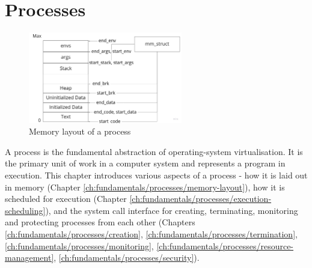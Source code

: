 \section{Processes}
\begin{figure}[H]
    \centering
    \includegraphics[width=0.6\textwidth]{images/fundamentals/proc-mem-layout.jpg}
    \caption{Memory layout of a process \cite{10.5555/2490781}}
    \label{images:fundamentals/proc-mem-layout}
\end{figure}

A process is the fundamental abstraction of operating-system virtualisation.  
It is the primary unit of work in a computer system and represents a program in execution.
This chapter introduces various aspects of a process - how it is laid out in memory 
(Chapter \ref{ch:fundamentals/processes/memory-layout}), how it is scheduled for execution 
(Chapter \ref{ch:fundamentals/processes/execution-scheduling}), and the system call interface for 
creating, terminating, monitoring and protecting processes from each other 
(Chapters \ref{ch:fundamentals/processes/creation}, \ref{ch:fundamentals/processes/termination},
\ref{ch:fundamentals/processes/monitoring}, \ref{ch:fundamentals/processes/resource-management}, 
\ref{ch:fundamentals/processes/security}).


